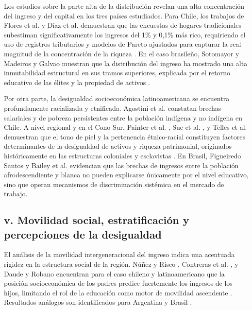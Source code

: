 Los estudios sobre la parte alta de la distribución revelan una alta concentración del ingreso y del capital en los tres países estudiados. Para Chile, los trabajos de Flores et al. \parencite*{Floresetal2020} y Díaz et al. \parencite*{Diazetal2021} demuestran que las encuestas de hogares tradicionales subestiman significativamente los ingresos del 1\% y 0,1\% más rico, requiriendo el uso de registros tributarios y modelos de Pareto ajustados para capturar la real magnitud de la concentración de la riqueza \parencite{Contreras1999, BravoValderrama2011}. En el caso brasileño, Sotomayor \parencite*{Sotomayor2008} y Madeiros y Galvao \parencite*{MadeirosGalvao2014} muestran que la distribución del ingreso ha mostrado una alta inmutabilidad estructural en sus tramos superiores, explicada por el retorno educativo de las élites y la propiedad de activos \parencite{Nascimientoetal1999}.

Por otra parte, la desigualdad socioeconómica latinoamericana se encuentra profundamente racializada y etnificada. Agostini et al. \parencite*{Agostinietal2010} constatan brechas salariales y de pobreza persistentes entre la población indígena y no indígena en Chile. A nivel regional y en el Cono Sur, Painter et al. \parencite*{Painteretal2020}, Sue et al. \parencite*{Sueetal2024}, y Telles et al. \parencite*{Tellesetal2025} demuestran que el tono de piel y la pertenencia étnico-racial constituyen factores determinantes de la desigualdad de activos y riqueza patrimonial, originados históricamente en las estructuras coloniales y esclavistas \parencite{Soaresetal2012, Gradin2014}. En Brasil, Figueiredo Santos \parencite*{FigueiredoSantos2005} y Bailey et al. \parencite*{Baileyetal2014} evidencian que las brechas de ingresos entre la población afrodescendiente y blanca no pueden explicarse únicamente por el nivel educativo, sino que operan mecanismos de discriminación sistémica en el mercado de trabajo.

\subsection{v. Movilidad social, estratificación y percepciones de la desigualdad}

El análisis de la movilidad intergeneracional del ingreso indica una acentuada rigidez en la estructura social de la región. Núñez y Risco \parencite*{NunezRisco2004}, Contreras et al. \parencite*{Contrerasetal2014}, y Daude y Robano \parencite*{DaudeRobano2015} encuentran para el caso chileno y latinoamericano que la posición socioeconómica de los padres predice fuertemente los ingresos de los hijos, limitando el rol de la educación como motor de movilidad ascendente \parencite{Contrerasetal2014}. Resultados análogos son identificados para Argentina \parencite{BeccariaGroisman2008} y Brasil \parencite{CostaRibeiroCarcalhaes2024}.

